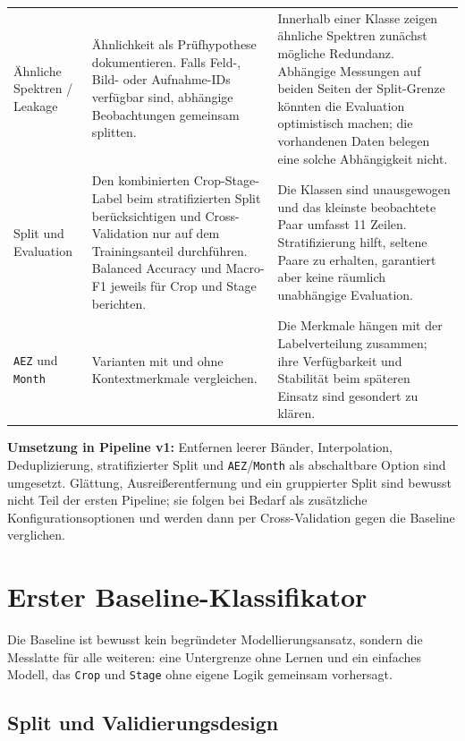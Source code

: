 \documentclass[11pt,a4paper]{article}
\begin{document}
\begin{longtable}{p{2.4cm}p{6.0cm}p{6.9cm}}
Ähnliche Spektren / Leakage & Ähnlichkeit als Prüfhypothese dokumentieren. Falls Feld-, Bild- oder Aufnahme-IDs verfügbar sind, abhängige Beobachtungen gemeinsam splitten. & Innerhalb einer Klasse zeigen ähnliche Spektren zunächst mögliche Redundanz. Abhängige Messungen auf beiden Seiten der Split-Grenze könnten die Evaluation optimistisch machen; die vorhandenen Daten belegen eine solche Abhängigkeit nicht. \\

Split und Evaluation & Den kombinierten Crop-Stage-Label beim stratifizierten Split berücksichtigen und Cross-Validation nur auf dem Trainingsanteil durchführen. Balanced Accuracy und Macro-F1 jeweils für Crop und Stage berichten. & Die Klassen sind unausgewogen und das kleinste beobachtete Paar umfasst 11 Zeilen. Stratifizierung hilft, seltene Paare zu erhalten, garantiert aber keine räumlich unabhängige Evaluation. \\

\texttt{AEZ} und \texttt{Month} & Varianten mit und ohne Kontextmerkmale vergleichen. & Die Merkmale hängen mit der Labelverteilung zusammen; ihre Verfügbarkeit und Stabilität beim späteren Einsatz sind gesondert zu klären. \\
\end{longtable}
\endgroup

\textbf{Umsetzung in Pipeline v1:} Entfernen leerer Bänder, Interpolation, Deduplizierung,
stratifizierter Split und \texttt{AEZ}/\texttt{Month} als abschaltbare Option sind umgesetzt.
Glättung, Ausreißerentfernung und ein gruppierter Split sind bewusst nicht Teil der ersten
Pipeline; sie folgen bei Bedarf als zusätzliche Konfigurationsoptionen und werden dann per
Cross-Validation gegen die Baseline verglichen.

\section{Erster Baseline-Klassifikator}

Die Baseline ist bewusst kein begründeter Modellierungsansatz, sondern die Messlatte für alle
weiteren: eine Untergrenze ohne Lernen und ein einfaches Modell, das \texttt{Crop} und
\texttt{Stage} ohne eigene Logik gemeinsam vorhersagt.

\subsection{Split und Validierungsdesign}
\label{sec:split}
\end{document}
